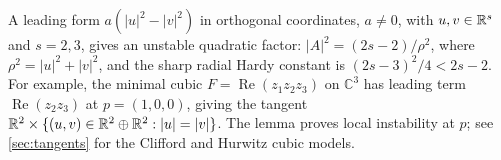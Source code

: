 A leading form $a(|u|^2-|v|^2)$ in orthogonal coordinates,
$a\ne0$, with $u,v\in\mathbb R^s$ and $s=2,3$, gives an unstable
quadratic factor: $|A|^2=(2s-2)/\rho^2$, where
$\rho^2=|u|^2+|v|^2$, and the sharp radial Hardy constant is
$(2s-3)^2/4<2s-2$.
For example, the minimal cubic $F=\operatorname{Re}(z_1z_2z_3)$
on $\mathbb C^3$ has leading term $\operatorname{Re}(z_2z_3)$
at $p=(1,0,0)$, giving the tangent
$\mathbb R^2\times\{(u,v)\in\mathbb R^2\oplus\mathbb R^2:|u|=|v|\}$.
The lemma proves local instability at $p$; see
\cref{sec:tangents} for the Clifford and Hurwitz cubic models.
